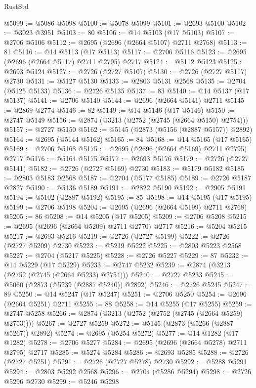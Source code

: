 \begin{lexlean}{RustStd}
\begin{coremodule}
@5099 := @5086 @5098
@5100 := @5078 @5099
@5101 := @2693 @5100
@5102 := @3023 @3951
@5103 := 80
@5106 := @14 @5103 (@17 @5103)
@5107 := @2706 @5106
@5112 := @2695 (@2696 (@2664 @5107) @2711 @2768)
@5113 := 81
@5116 := @14 @5113 (@17 @5113)
@5117 := @2706 @5116
@5123 := @2695 (@2696 (@2664 @5117) @2711 @2795) @2717
@5124 := @5112 @5123
@5125 := @2693 @5124
@5127 := @2726 (@2727 @5107)
@5130 := @2726 (@2727 @5117) @2730
@5131 := @5127 @5130
@5133 := @2803 @5131 @2568
@5135 := @2704 (@5125 @5133)
@5136 := @2726 @5135
@5137 := 83
@5140 := @14 @5137 (@17 @5137)
@5141 := @2706 @5140
@5144 := @2696 (@2664 @5141) @2711
@5145 := @2869 @2774
@5146 := 82
@5149 := @14 @5146 (@17 @5146)
@5150 := @2747 @5149
@5156 := @2874 (@3213 (@2752 (@2745 (@2664 @5150) @2754)))
@5157 := @2727 @5150
@5162 := @5145 (@2873 (@5156 (@2887 @5157)) @2892)
@5164 := @2695 (@5144 @5162)
@5165 := 84
@5168 := @14 @5165 (@17 @5165)
@5169 := @2706 @5168
@5175 := @2695 (@2696 (@2664 @5169) @2711 @2795) @2717
@5176 := @5164 @5175
@5177 := @2693 @5176
@5179 := @2726 (@2727 @5141)
@5182 := @2726 (@2727 @5169) @2730
@5183 := @5179 @5182
@5185 := @2803 @5183 @2568
@5187 := @2704 (@5177 @5185)
@5189 := @2726 @5187 @2827
@5190 := @5136 @5189
@5191 := @2822 @5190
@5192 := @2905 @5191
@5194 := @5102 (@2887 @5192)
@5195 := 85
@5198 := @14 @5195 (@17 @5195)
@5199 := @2706 @5198
@5204 := @2695 (@2696 (@2664 @5199) @2711 @2768)
@5205 := 86
@5208 := @14 @5205 (@17 @5205)
@5209 := @2706 @5208
@5215 := @2695 (@2696 (@2664 @5209) @2711 @2770) @2717
@5216 := @5204 @5215
@5217 := @2693 @5216
@5219 := @2726 (@2727 @5199)
@5222 := @2726 (@2727 @5209) @2730
@5223 := @5219 @5222
@5225 := @2803 @5223 @2568
@5227 := @2704 (@5217 @5225)
@5228 := @2726 @5227
@5229 := 87
@5232 := @14 @5229 (@17 @5229)
@5233 := @2747 @5232
@5239 := @2874 (@3213 (@2752 (@2745 (@2664 @5233) @2754)))
@5240 := @2727 @5233
@5245 := @5060 (@2873 (@5239 (@2887 @5240)) @2892)
@5246 := @2726 @5245
@5247 := 89
@5250 := @14 @5247 (@17 @5247)
@5251 := @2706 @5250
@5254 := @2696 (@2664 @5251) @2711
@5255 := 88
@5258 := @14 @5255 (@17 @5255)
@5259 := @2747 @5258
@5266 := @2874 (@3213 (@2752 (@2752 (@2745 (@2664 @5259) @2753))))
@5267 := @2727 @5259
@5272 := @5145 (@2873 (@5266 (@2887 @5267)) @2892)
@5274 := @2695 (@5254 @5272)
@5277 := @14 @1282 (@17 @1282)
@5278 := @2706 @5277
@5284 := @2695 (@2696 (@2664 @5278) @2711 @2795) @2717
@5285 := @5274 @5284
@5286 := @2693 @5285
@5288 := @2726 (@2727 @5251)
@5291 := @2726 (@2727 @5278) @2730
@5292 := @5288 @5291
@5294 := @2803 @5292 @2568
@5296 := @2704 (@5286 @5294)
@5298 := @2726 @5296 @2730
@5299 := @5246 @5298

\end{coremodule}
\end{lexlean}
